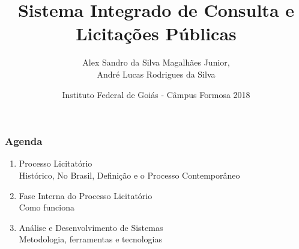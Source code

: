 \documentclass{beamer}
\title{Sistema Integrado de Consulta e Licitações Públicas}
\subtitle{Alex Sandro da Silva Magalhães Junior,\\ André Lucas Rodrigues da Silva}
\author{Instituto Federal de Goiás - Câmpus Formosa 2018}
\date{}
\begin{document}
	\setcounter{showProgressBar}{0}
	\setcounter{showSlideNumbers}{0}

	\frame{\titlepage}

	\begin{frame}
		\frametitle{Agenda}
		\begin{enumerate}
			\item Processo Licitatório\\ %
			\textcolor{ExecusharesGrey}{\footnotesize\hspace{1em} Histórico, No Brasil, Definição e o Processo Contemporâneo}\\
			\item Fase Interna do Processo Licitatório\\
			\textcolor{ExecusharesGrey}{\footnotesize\hspace{1em} Como funciona}\\
			\item Análise e Desenvolvimento de Sistemas \\
			\textcolor{ExecusharesGrey}{\footnotesize\hspace{1em} Metodologia, ferramentas e tecnologias}\\

\end{enumerate}
\end{frame}
\end{document}
